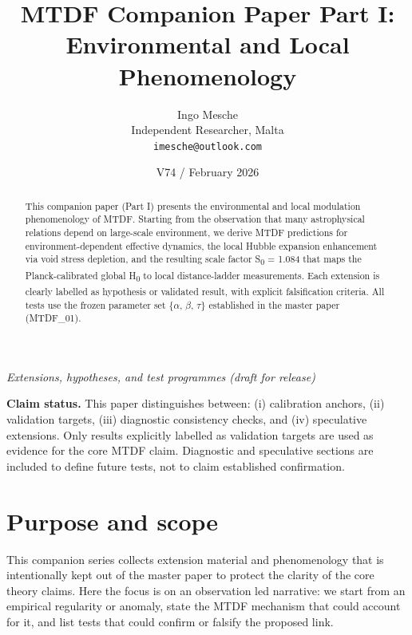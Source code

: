 \documentclass[11pt,a4paper]{article}
\title{MTDF Companion Paper Part I: Environmental and Local Phenomenology}
\author{Ingo Mesche\\ \small Independent Researcher, Malta \\ \small \texttt{imesche@outlook.com}}
\date{V74 / February 2026}
\begin{document}
\maketitle
\begin{center}\itshape Extensions, hypotheses, and test programmes (draft for release)\end{center}



\tableofcontents

\begin{abstract}
This companion paper (Part I) presents the environmental and local modulation phenomenology of MTDF. Starting from the observation that many astrophysical relations depend on large-scale environment, we derive MTDF predictions for environment-dependent effective dynamics, the local Hubble expansion enhancement via void stress depletion, and the resulting scale factor S\textsubscript{0} = 1.084 that maps the Planck-calibrated global H\textsubscript{0} to local distance-ladder measurements. Each extension is clearly labelled as hypothesis or validated result, with explicit falsification criteria. All tests use the frozen parameter set \{$\alpha$, $\beta$, $\tau$\} established in the master paper (MTDF\_\allowbreak{}01).
\end{abstract}

\begin{mdframed}[linecolor=accent,linewidth=0.5pt,backgroundcolor=callout-bg,leftline=true,rightline=true,topline=true,bottomline=true,innerleftmargin=8pt,innerrightmargin=8pt,innertopmargin=6pt,innerbottommargin=6pt]
\textbf{Claim status.}
This paper distinguishes between:
(i) calibration anchors,
(ii) validation targets,
(iii) diagnostic consistency checks, and
(iv) speculative extensions.
Only results explicitly labelled as validation targets are used as evidence for the core MTDF claim. Diagnostic and speculative sections are included to define future tests, not to claim established confirmation.
\end{mdframed}


\section{Purpose and scope}
\label{sec:purpose}
This companion series collects extension material and phenomenology that is intentionally kept out of the master paper to protect the clarity of the core theory claims.
Here the focus is on an observation led narrative: we start from an empirical regularity or anomaly, state the MTDF mechanism that could account for it, and list tests that could confirm or falsify the proposed link.
\end{document}
